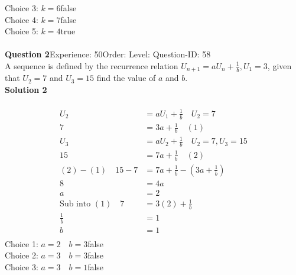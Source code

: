 \documentclass{article}
\begin{document}
Choice 3: \hspace{20pt}$k=6$\hspace{20pt}false\\
Choice 4: \hspace{20pt}$k=7$\hspace{20pt}false\\
Choice 5: \hspace{20pt}$k=4$\hspace{20pt}true\\
\\[4pt]
\noindent\textbf{Question 2}\hspace{20pt}Experience: 50\hspace{20pt}Order: \hspace{20pt}Level: \hspace{20pt}Question-ID: 58\\[2pt]
A sequence is defined by the recurrence relation $U_{n+1}=aU_n+\displaystyle\frac{1}{b}, U_1=3$, given that $U_2=7$ and $U_3=15$ find the value of $a$ and $b$.\\[4pt]
\noindent\textbf{Solution 2}\\[2pt]
\\[-35pt]\begin{align*}
U_2&=aU_1+\displaystyle\frac{1}{b} \quad U_2=7\\[2pt]
7&=3a+\displaystyle\frac{1}{b}\quad (1)\\[12pt]
U_3&=aU_2+\displaystyle\frac{1}{b} \quad U_2=7,U_3=15\\[2pt]
15&=7a+\displaystyle\frac{1}{b}\quad (2)\\[12pt]
(2)-(1)\quad 15-7&=7a+\displaystyle\frac{1}{b}-\left(3a+\displaystyle\frac{1}{b}\right)\\[2pt]
8&=4a\\[2pt]
a&=2\\[2pt]
\text{Sub into}\,\, (1)\quad 7&=3(2)+\displaystyle\frac{1}{b}\\[2pt]
\displaystyle\frac{1}{b}&=1\\[2pt]
b&=1\\[2pt]
\end{align*}
Choice 1: \hspace{20pt}$a=2\quad b=3$\hspace{20pt}false\\
Choice 2: \hspace{20pt}$a=3\quad b=3$\hspace{20pt}false\\
Choice 3: \hspace{20pt}$a=3\quad b=1$\hspace{20pt}false\\
\end{document}
